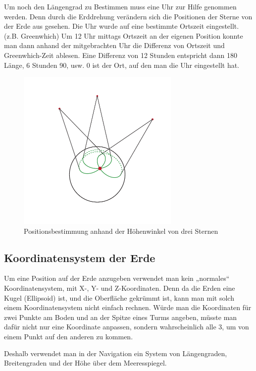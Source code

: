 \documentclass[12pt,a4paper]{scrartcl}
\begin{document}
Um noch den Längengrad zu Bestimmen muss eine Uhr zur Hilfe genommen werden. Denn durch die Erddrehung verändern sich die Positionen der Sterne von der Erde aus gesehen. Die Uhr wurde auf eine bestimmte Ortszeit eingestellt. (z.B. Greenwhich) Um 12 Uhr mittags Ortszeit an der eigenen Position konnte man dann anhand der mitgebrachten Uhr die Differenz von Ortszeit und Greenwhich-Zeit ablesen. Eine Differenz von 12 Stunden entspricht dann 180\degree{} Länge, 6 Stunden 90\degree{}, usw. 0\degree{} ist der Ort, auf den man die Uhr eingestellt hat.

\begin{figure}[H]
\centering
\includegraphics[width=0.7\textwidth]{img/earth_cones.pdf}
\caption{Positionsbestimmung anhand der Höhenwinkel von drei Sternen}
\end{figure}

\subsection{Koordinatensystem der Erde}
Um eine Position auf der Erde anzugeben verwendet man kein „normales“ Koordinatensystem, mit X-, Y- und Z-Koordinaten. Denn da die Erden eine Kugel (Ellipsoid) ist, und die Oberfläche gekrümmt ist, kann man mit solch einem Koordinatensystem nicht einfach rechnen. Würde man die Koordinaten für zwei Punkte am Boden und an der Spitze eines Turms angeben, müsste man dafür nicht nur eine Koordinate anpassen, sondern wahrscheinlich alle 3, um von einem Punkt auf den anderen zu kommen.

Deshalb verwendet man in der Navigation ein System von Längengraden, Breitengraden und der Höhe über dem Meeresspiegel.
\end{document}
